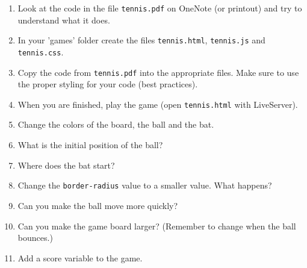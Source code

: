 \documentclass[english,11pt,a4paper]{report}
\begin{document}
\begin{ex}
\begin{enumerate}
\item Look at the code in the file \verb|tennis.pdf| on OneNote (or printout) and try to understand what it does.
\item In your 'games' folder create the files \verb|tennis.html|, \verb|tennis.js| and \verb|tennis.css|.
\item Copy the code from \verb|tennis.pdf| into the appropriate files. Make sure to use  the proper styling for your code (best practices). 
\item When you are finished, play the game (open \verb|tennis.html| with LiveServer).
\item Change the colors of the board, the ball and the bat.
\item What is the initial position of the ball?
\item Where does the bat start?
\item Change the \verb|border-radius| value to a smaller value. What happens?
\item Can you make the ball move more quickly?
\item Can you make the game board larger? (Remember to change when the ball bounces.)
\item Add a score variable to the game. 
\end{enumerate}
\end{ex}
\end{document}
